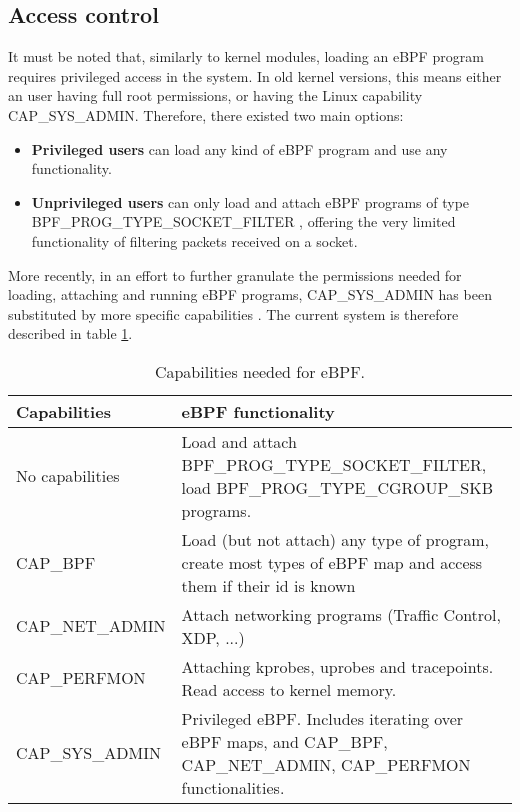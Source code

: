 \subsection{Access control} \label{subsection:access_control}
It must be noted that, similarly to kernel modules, loading an eBPF program requires privileged access in the system. In old kernel versions, this means either an user having full root permissions, or having the Linux capability \cite{ubuntu_caps} CAP\_SYS\_ADMIN. Therefore, there existed two main options:
\begin{itemize}
\item \textbf{Privileged users} can load any kind of eBPF program and use any functionality.
\item \textbf{Unprivileged users} can only load and attach eBPF programs of type BPF\_PROG\_TYPE\_SOCKET\_FILTER \cite{evil_ebpf_p9}, offering the very limited functionality of filtering packets received on a socket.
\end{itemize}

More recently, in an effort to further granulate the permissions needed for loading, attaching and running eBPF programs, CAP\_SYS\_ADMIN has been substituted by more specific capabilities \cite{ebpf_caps_intro} \cite{ebpf_caps_lwn}. The current system is therefore described in table \ref{table:ebpf_caps_current}.

\begin{table}[htbp]
\begin{tabular}{|>{\centering\arraybackslash}p{4cm}|>{\centering\arraybackslash}p{10cm}|}
\hline
Capabilities & eBPF functionality\\
\hline
\hline
No capabilities & Load and attach BPF\_PROG\_TYPE\_SOCKET\_FILTER, load BPF\_PROG\_TYPE\_CGROUP\_SKB programs.\\
\hline
CAP\_BPF & Load (but not attach) any type of program, create most types of eBPF map and access them if their id is known\\
\hline
CAP\_NET\_ADMIN & Attach networking programs (Traffic Control, XDP, ...)\\
\hline
CAP\_PERFMON & Attaching kprobes, uprobes and tracepoints. Read access to kernel memory.\\
\hline
CAP\_SYS\_ADMIN & Privileged eBPF. Includes iterating over eBPF maps, and CAP\_BPF, CAP\_NET\_ADMIN, CAP\_PERFMON functionalities.\\
\hline
\end{tabular}
\caption{Capabilities needed for eBPF.}
\label{table:ebpf_caps_current}
\end{table}

